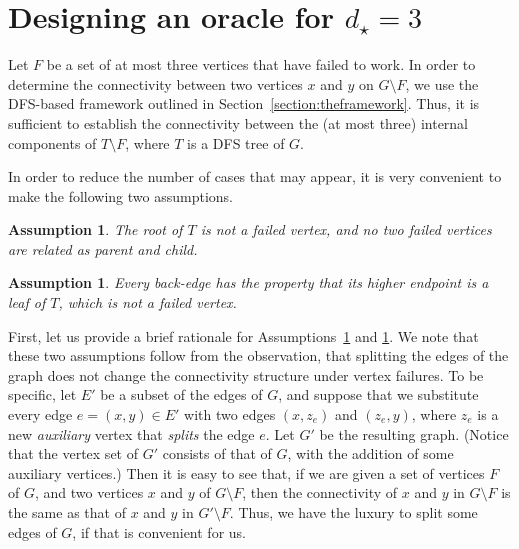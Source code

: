 \documentclass[11pt,a4paper]{article}
\newtheorem{assumption}[theorem]{Assumption}
\begin{document}
\section{Designing an oracle for $d_{\star}=3$}
\label{section:oraclefor3}
Let $F$ be a set of at most three vertices that have failed to work. In order to determine the connectivity between two vertices $x$ and $y$ on $G\setminus F$, we use the DFS-based framework outlined in Section~\ref{section:theframework}. Thus, it is sufficient to establish the connectivity between the (at most three) internal components of $T\setminus F$, where $T$ is a DFS tree of $G$.

In order to reduce the number of cases that may appear, it is very convenient to make the following two assumptions.

\begin{assumption}
\label{assumption1}
The root of $T$ is not a failed vertex, and no two failed vertices are related as parent and child.
\end{assumption}

\begin{assumption}
\label{assumption2}
Every back-edge has the property that its higher endpoint is a leaf of $T$, which is not a failed vertex.
\end{assumption}

First, let us provide a brief rationale for Assumptions~\ref{assumption1} and \ref{assumption2}. We note that these two assumptions follow from the observation, that splitting the edges of the graph does not change the connectivity structure under vertex failures. To be specific, let $E'$ be a subset of the edges of $G$, and suppose that we substitute every edge $e=(x,y)\in E'$ with two edges $(x,z_e)$ and $(z_e,y)$, where $z_e$ is a new \emph{auxiliary} vertex that \emph{splits} the edge $e$. Let $G'$ be the resulting graph. (Notice that the vertex set of $G'$ consists of that of $G$, with the addition of some auxiliary vertices.) Then it is easy to see that, if we are given a set of vertices $F$ of $G$, and two vertices $x$ and $y$ of $G\setminus F$, then the connectivity of $x$ and $y$ in $G\setminus F$ is the same as that of $x$ and $y$ in $G'\setminus F$. Thus, we have the luxury to split some edges of $G$, if that is convenient for us.
\end{document}
